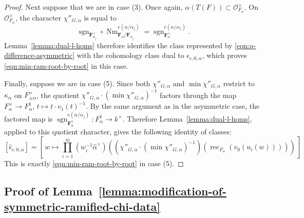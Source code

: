 \documentclass[reqno]{amsart}
\numberwithin{equation}{subsection}
\newcommand{\F}{\mathbf{F}}
\newcommand{\sgn}{\operatorname{sgn}}
\newcommand{\wh}[1]{\widehat{#1}}
\newcommand{\co}{\colon}
\newcommand\cO{\mathcal{O}}
\DeclareMathOperator{\Nm}{Nm}
\DeclareMathOperator{\rec}{rec}
\theoremstyle{remark}
\numberwithin{equation}{subsection}
\numberwithin{figure}{subsection}
\begin{document}
\begin{proof}
Next suppose that we are in case (3). Once again, $\alpha(T(F))\subset\cO_{F_\alpha}^\times$. On $\cO_{F_\alpha}^\times$, the character $\chi''_{G,\alpha}$ is equal to
\[
\sgn_{\F_{\alpha_j}^\times} \circ \Nm_{\F_\alpha/\F_{\alpha_j}}^{e(\alpha/\alpha_j)} = \sgn_{\F_\alpha^\times}^{e(\alpha/\alpha_j)}.
\]
Lemma~\ref{lemma:dual-l-homs} therefore identifies the class represented by \eqref{eqn:q-difference-asymmetric} with the cohomology class dual to $\epsilon_{\flat,0,\alpha}$, which proves \eqref{eqn:min-ram-root-by-root} in this case.

Finally, suppose we are in case (5). Since both $\chi''_{G,\alpha}$ and $\min\chi''_{G,\alpha}$ restrict to $\kappa_\alpha$ on $F_{\pm\alpha}^\times$, the quotient $\chi''_{G,\alpha} \cdot (\min\chi''_{G,\alpha})^{-1}$ factors through the map $F_\alpha^\times \to F_\alpha^1$, $t \mapsto t \cdot v_1(t)^{-1}$. By the same argument as in the asymmetric case, the factored map is $\sgn_{\F_\alpha^1}^{e(\alpha/\alpha_j)}\co F_\alpha^1 \to k^\times$. Therefore Lemma~\ref{lemma:dual-l-homs}, applied to this quotient character, gives the following identity of classes:
\[
[\wh\epsilon_{\flat,0,\alpha}]=\left[\,w\longmapsto\prod_{i=1}^m (w_i^{-1}\wh\alpha^\vee)((\chi''_{G,\alpha}\cdot(\min\chi''_{G,\alpha})^{-1})(\rec_{F_\alpha}(v_0(u_i(w)))))\,\right]
\]
This is exactly \eqref{eqn:min-ram-root-by-root} in case (5).
\end{proof}


\subsection{Proof of Lemma~\ref{lemma:modification-of-symmetric-ramified-chi-data}}\label{app:modification-symmetric-proof}
\end{document}

